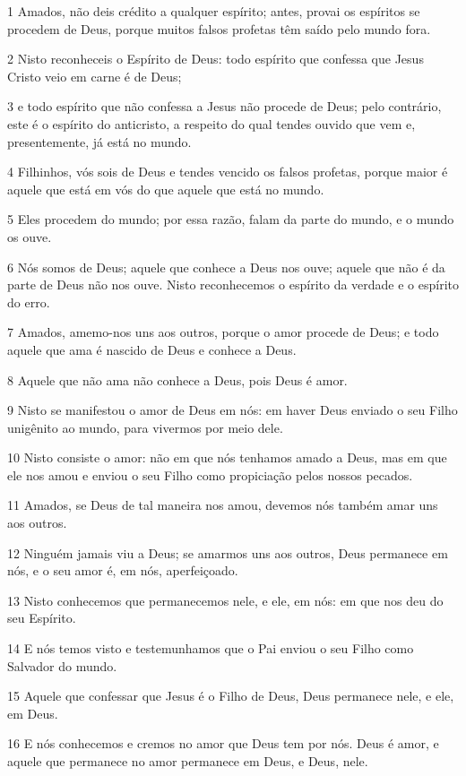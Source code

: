 \par 1 Amados, não deis crédito a qualquer espírito; antes, provai os espíritos se procedem de Deus, porque muitos falsos profetas têm saído pelo mundo fora.
\par 2 Nisto reconheceis o Espírito de Deus: todo espírito que confessa que Jesus Cristo veio em carne é de Deus;
\par 3 e todo espírito que não confessa a Jesus não procede de Deus; pelo contrário, este é o espírito do anticristo, a respeito do qual tendes ouvido que vem e, presentemente, já está no mundo.
\par 4 Filhinhos, vós sois de Deus e tendes vencido os falsos profetas, porque maior é aquele que está em vós do que aquele que está no mundo.
\par 5 Eles procedem do mundo; por essa razão, falam da parte do mundo, e o mundo os ouve.
\par 6 Nós somos de Deus; aquele que conhece a Deus nos ouve; aquele que não é da parte de Deus não nos ouve. Nisto reconhecemos o espírito da verdade e o espírito do erro.
\par 7 Amados, amemo-nos uns aos outros, porque o amor procede de Deus; e todo aquele que ama é nascido de Deus e conhece a Deus.
\par 8 Aquele que não ama não conhece a Deus, pois Deus é amor.
\par 9 Nisto se manifestou o amor de Deus em nós: em haver Deus enviado o seu Filho unigênito ao mundo, para vivermos por meio dele.
\par 10 Nisto consiste o amor: não em que nós tenhamos amado a Deus, mas em que ele nos amou e enviou o seu Filho como propiciação pelos nossos pecados.
\par 11 Amados, se Deus de tal maneira nos amou, devemos nós também amar uns aos outros.
\par 12 Ninguém jamais viu a Deus; se amarmos uns aos outros, Deus permanece em nós, e o seu amor é, em nós, aperfeiçoado.
\par 13 Nisto conhecemos que permanecemos nele, e ele, em nós: em que nos deu do seu Espírito.
\par 14 E nós temos visto e testemunhamos que o Pai enviou o seu Filho como Salvador do mundo.
\par 15 Aquele que confessar que Jesus é o Filho de Deus, Deus permanece nele, e ele, em Deus.
\par 16 E nós conhecemos e cremos no amor que Deus tem por nós. Deus é amor, e aquele que permanece no amor permanece em Deus, e Deus, nele.
